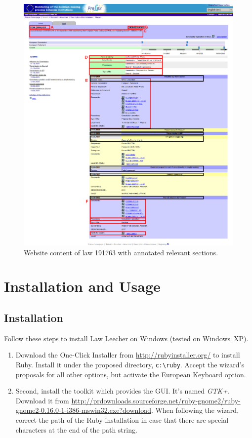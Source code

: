 \documentclass{scrartcl}
\begin{document}
\begin{figure}[ht]
\begin{center}
\includegraphics[width = \textwidth]{prelex.png}
\caption{Website content of law 191763 with annotated relevant sections.}
\label{fig:screenshot}
\end{center}
\end{figure}

\clearpage

\section{Installation and Usage}
\subsection{Installation}
Follow these steps to install Law Leecher on Windows (tested on Windows~XP).
\begin{enumerate}
\item Download the One-Click Installer from \url{http://rubyinstaller.org/} to install Ruby. Install it under the proposed directory, \texttt{c:\textbackslash ruby}. Accept the wizard's proposals for all other options, but activate the European Keyboard option.

\item Second, install the toolkit which provides the GUI. It's named \textit{GTK+}. Download it from \url{http://prdownloads.sourceforge.net/ruby-gnome2/ruby-gnome2-0.16.0-1-i386-mswin32.exe?download}. When following the wizard, correct the path of the Ruby installation in case that there are special characters at the end of the path string. 
\end{enumerate}
\end{document}
